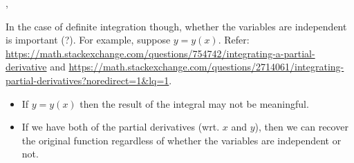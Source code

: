 \documentclass[../MathsNotesBase.tex]{subfiles}
\begin{document}
{		\sep
		
		In the case of definite integration though, whether the variables are independent is important (?). For example, suppose ${ y = y(x) }$. Refer: \url{https://math.stackexchange.com/questions/754742/integrating-a-partial-derivative} and \url{https://math.stackexchange.com/questions/2714061/integrating-partial-derivatives?noredirect=1&lq=1}.
		
		\begin{itemize}
			\item{If ${ y = y(x) }$ then the result of the integral may not be meaningful.}
			\item{If we have both of the partial derivatives (wrt. $x$ and $y$), then we can recover the original function regardless of whether the variables are independent or not.}
		\end{itemize}
	}
\end{document}
